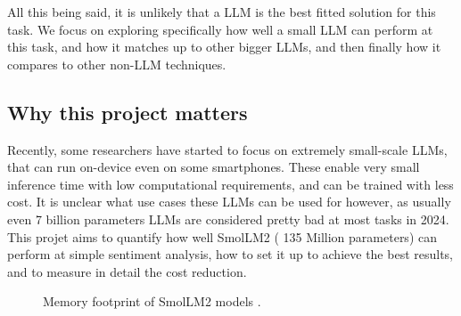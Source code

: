 \documentclass[10pt,twocolumn,letterpaper]{article}
\begin{document}
All this being said, it is unlikely that a LLM is the best fitted solution for this task. We focus on exploring specifically how well a small LLM can perform at this task, and how it matches up to other bigger LLMs, and then finally how it compares to other non-LLM techniques.




\subsection{Why this project matters}
Recently, some researchers have started to focus on extremely small-scale LLMs, that can run on-device even on some smartphones. These enable very small inference time with low computational requirements, and can be trained with less cost. It is unclear what use cases these LLMs can be used for however, as usually even 7 billion parameters LLMs are considered pretty bad at most tasks in 2024.
This projet aims to quantify how well SmolLM2 ( 135 Million parameters) can perform at simple sentiment analysis, how to set it up to achieve the best results, and to measure in detail the cost reduction.

\begin{figure}[t]
\begin{center}
\end{center}
   \caption{Memory footprint of SmolLM2 models \cite{hf-SmolLM2-usecase}.}
\label{fig:SmolLM2-memory}
\end{figure}
\end{document}
